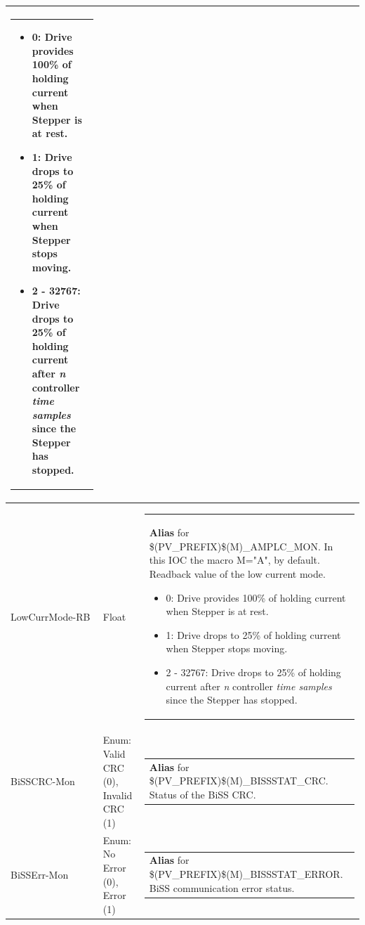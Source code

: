 \documentclass[openany]{article}
\begin{document}
\begin{longtable}{| m{4.5cm} m{2.5cm}  m{8.5cm} |}
\begin{tabular}{@{}m{6cm}@{}}
                \begin{itemize}
                    \item 0: Drive provides 100\% of holding current when Stepper is at rest.
                    \item 1: Drive drops to 25\% of holding current when Stepper stops moving.
                    \item 2 - 32767: Drive drops to 25\% of holding current after \emph{n} controller \emph{time samples} since the Stepper has stopped.
                \end{itemize}
            \end{tabular} \hypertarget{}{}\\ \hline
        LowCurrMode-RB & Float & \begin{tabular}{@{}m{6cm}@{}}
                \textbf{\color{blue} Alias} for \$(PV\_PREFIX)\$(M)\_AMPLC\_MON. In this IOC the macro M="A", by default. Readback value of the low current mode.
                \begin{itemize}
                    \item 0: Drive provides 100\% of holding current when Stepper is at rest.
                    \item 1: Drive drops to 25\% of holding current when Stepper stops moving.
                    \item 2 - 32767: Drive drops to 25\% of holding current after \emph{n} controller \emph{time samples} since the Stepper has stopped.
                \end{itemize}
            \end{tabular} \hypertarget{pv:biss-crc-mon}{}\\ \hline
        BiSSCRC-Mon & Enum: Valid CRC (0), Invalid CRC (1) & \begin{tabular}{@{}m{6cm}@{}}
                \textbf{\color{blue} Alias} for \$(PV\_PREFIX)\$(M)\_BISSSTAT\_CRC. Status of the BiSS CRC.
            \end{tabular} \hypertarget{pv:biss-err-mon}{}\\ \hline
        BiSSErr-Mon & Enum: No Error (0), Error (1) & \begin{tabular}{@{}m{6cm}@{}}
                \textbf{\color{blue} Alias} for \$(PV\_PREFIX)\$(M)\_BISSSTAT\_ERROR. BiSS communication error status.
            \end{tabular} \hypertarget{pv:biss-poll}{}\\ \hline

\end{longtable}
\end{document}
